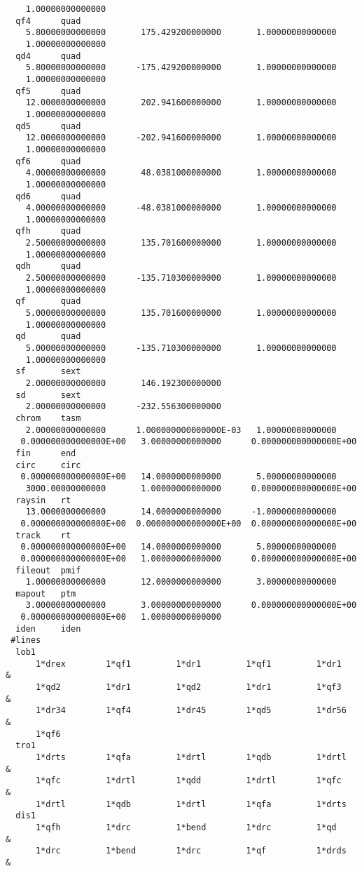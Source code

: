 {\begin{verbatim}
    1.00000000000000
  qf4      quad
    5.80000000000000       175.429200000000       1.00000000000000
    1.00000000000000
  qd4      quad
    5.80000000000000      -175.429200000000       1.00000000000000
    1.00000000000000
  qf5      quad
    12.0000000000000       202.941600000000       1.00000000000000
    1.00000000000000
  qd5      quad
    12.0000000000000      -202.941600000000       1.00000000000000
    1.00000000000000
  qf6      quad
    4.00000000000000       48.0381000000000       1.00000000000000
    1.00000000000000
  qd6      quad
    4.00000000000000      -48.0381000000000       1.00000000000000
    1.00000000000000
  qfh      quad
    2.50000000000000       135.701600000000       1.00000000000000
    1.00000000000000
  qdh      quad
    2.50000000000000      -135.710300000000       1.00000000000000
    1.00000000000000
  qf       quad
    5.00000000000000       135.701600000000       1.00000000000000
    1.00000000000000
  qd       quad
    5.00000000000000      -135.710300000000       1.00000000000000
    1.00000000000000
  sf       sext
    2.00000000000000       146.192300000000
  sd       sext
    2.00000000000000      -232.556300000000
  chrom    tasm
    2.00000000000000      1.000000000000000E-03   1.00000000000000
   0.000000000000000E+00   3.00000000000000      0.000000000000000E+00
  fin      end
  circ     circ
   0.000000000000000E+00   14.0000000000000       5.00000000000000
    3000.00000000000       1.00000000000000      0.000000000000000E+00
  raysin   rt
    13.0000000000000       14.0000000000000      -1.00000000000000
   0.000000000000000E+00  0.000000000000000E+00  0.000000000000000E+00
  track    rt
   0.000000000000000E+00   14.0000000000000       5.00000000000000
   0.000000000000000E+00   1.00000000000000      0.000000000000000E+00
  fileout  pmif
    1.00000000000000       12.0000000000000       3.00000000000000
  mapout   ptm
    3.00000000000000       3.00000000000000      0.000000000000000E+00
   0.000000000000000E+00   1.00000000000000
  iden     iden
 #lines
  lob1
      1*drex        1*qf1         1*dr1         1*qf1         1*dr1      &
      1*qd2         1*dr1         1*qd2         1*dr1         1*qf3      &
      1*dr34        1*qf4         1*dr45        1*qd5         1*dr56     &
      1*qf6
  tro1
      1*drts        1*qfa         1*drtl        1*qdb         1*drtl     &
      1*qfc         1*drtl        1*qdd         1*drtl        1*qfc      &
      1*drtl        1*qdb         1*drtl        1*qfa         1*drts
  dis1
      1*qfh         1*drc         1*bend        1*drc         1*qd       &
      1*drc         1*bend        1*drc         1*qf          1*drds     &

\end{verbatim}}
